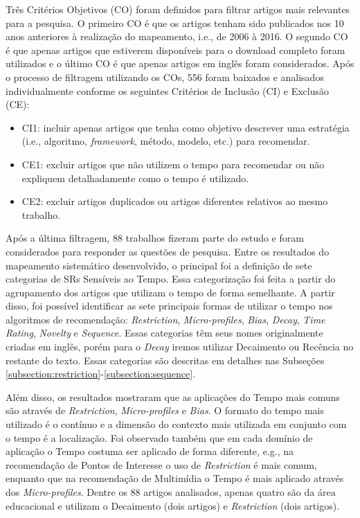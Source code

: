 Três Critérios Objetivos (CO) foram definidos para filtrar artigos mais relevantes para a pesquisa. O primeiro CO é que os
artigos tenham sido publicados nos 10 anos anteriores à realização do mapeamento, i.e., de 2006 à 2016. O segundo CO é
que apenas artigos que estiverem disponíveis para o download completo foram utilizados e o último CO é que apenas artigos
em inglês foram considerados. Após o processo de filtragem utilizando os COs, 556 foram baixados e analisados individualmente
conforme os seguintes Critérios de Inclusão (CI) e Exclusão (CE):

\begin{itemize}
\item CI1: incluir apenas artigos que tenha como objetivo descrever uma estratégia (i.e., algoritmo, \textit{framework},
método, modelo, etc.) para recomendar.
\item CE1: excluir artigos que não utilizem o tempo para recomendar ou não expliquem detalhadamente como o tempo é utilizado.
\item CE2: excluir artigos duplicados ou artigos diferentes relativos ao mesmo trabalho.
\end{itemize}

Após a última filtragem, 88 trabalhos fizeram parte do estudo e foram considerados para responder as
questões de pesquisa. Entre os resultados do mapeamento sistemático desenvolvido, o principal
foi a definição de sete categorias de SRs Sensíveis ao Tempo. Essa categorização foi feita a partir do agrupamento
dos artigos que utilizam o tempo de forma semelhante. A partir disso, foi possível identificar as sete principais
formas de utilizar o tempo nos algoritmos de recomendação: \textit{Restriction}, \textit{Micro-profiles}, \textit{Bias},
\textit{Decay}, \textit{Time Rating}, \textit{Novelty} e \textit{Sequence}. Essas categorias têm seus nomes originalmente
criadas em inglês, porém para o \textit{Decay} iremos utilizar Decaimento ou Recência no restante do texto. Essas
categorias são descritas em detalhes nas Subseções \ref{subsection:restriction}-\ref{subsection:sequence}.

Além disso, os resultados mostraram que as aplicações do Tempo mais comuns são através de \textit{Restriction},
\textit{Micro-profiles} e \textit{Bias}. O formato do tempo mais utilizado é o contínuo e a dimensão do contexto mais
utilizada em conjunto com o tempo é a localização. Foi observado também que em cada domínio de aplicação o Tempo costuma ser
aplicado de forma diferente, e.g., na recomendação de Pontos de Interesse o uso de \textit{Restriction} é mais comum, enquanto
que na recomendação de Multimídia o Tempo é mais aplicado através dos \textit{Micro-profiles}. Dentre os 88 artigos analisados,
apenas quatro são da área educacional e utilizam o Decaimento (dois artigos) e \textit{Restriction} (dois artigos).

